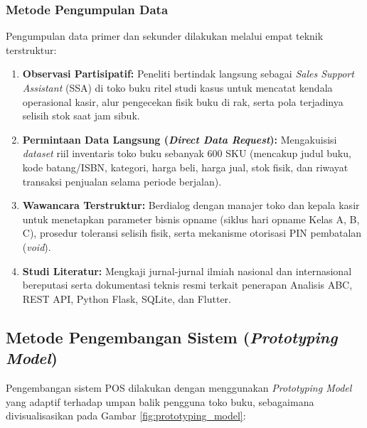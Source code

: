 \documentclass[11pt, a4paper]{article}
\begin{document}
\subsubsection{Metode Pengumpulan Data}
Pengumpulan data primer dan sekunder dilakukan melalui empat teknik terstruktur:
\begin{enumerate}[label=\arabic*.]
    \item \textbf{Observasi Partisipatif:} Peneliti bertindak langsung sebagai \textit{Sales Support Assistant} (SSA) di toko buku ritel studi kasus untuk mencatat kendala operasional kasir, alur pengecekan fisik buku di rak, serta pola terjadinya selisih stok saat jam sibuk.
    \item \textbf{Permintaan Data Langsung (\textit{Direct Data Request}):} Mengakuisisi \textit{dataset} riil inventaris toko buku sebanyak 600 SKU (mencakup judul buku, kode batang/ISBN, kategori, harga beli, harga jual, stok fisik, dan riwayat transaksi penjualan selama periode berjalan).
    \item \textbf{Wawancara Terstruktur:} Berdialog dengan manajer toko dan kepala kasir untuk menetapkan parameter bisnis opname (siklus hari opname Kelas A, B, C), prosedur toleransi selisih fisik, serta mekanisme otorisasi PIN pembatalan (\textit{void}).
    \item \textbf{Studi Literatur:} Mengkaji jurnal-jurnal ilmiah nasional dan internasional bereputasi serta dokumentasi teknis resmi terkait penerapan Analisis ABC, REST API, Python Flask, SQLite, dan Flutter.
\end{enumerate}

\subsection{Metode Pengembangan Sistem (\textit{Prototyping Model})}
Pengembangan sistem POS dilakukan dengan menggunakan \textit{Prototyping Model} yang adaptif terhadap umpan balik pengguna toko buku, sebagaimana divisualisasikan pada Gambar \ref{fig:prototyping_model}:
\end{document}
